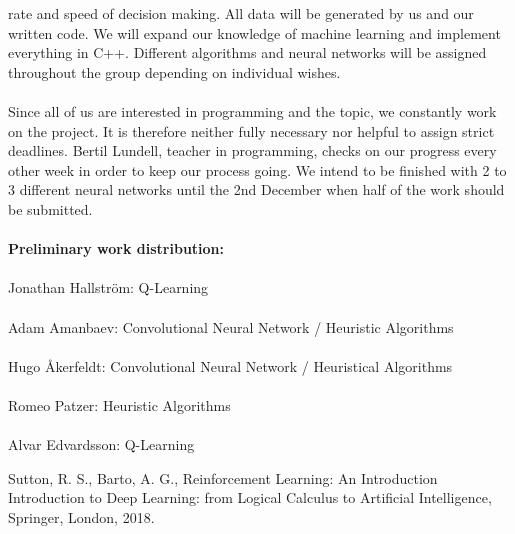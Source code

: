 \documentclass[titlepage]{article}
\begin{document}
rate and speed of decision making. All data will be generated by us and our written code. 
\newpage
\noindent
We will expand our knowledge of machine learning and implement everything in C++. Different algorithms and neural networks will be assigned throughout the group depending on individual wishes. \\\\Since all of us are interested in programming and the topic, we constantly work on the project. It is therefore neither fully necessary nor helpful to assign strict deadlines. Bertil Lundell, teacher in programming, checks on our progress every other week in order to keep our process going. We intend to be finished with 2 to 3 different neural networks until the 2nd December when half of the work should be submitted. \\\\\textbf{Preliminary work distribution:} \\\\Jonathan Hallström: Q-Learning \\\\Adam Amanbaev: Convolutional Neural Network / Heuristic Algorithms \\\\Hugo Åkerfeldt: Convolutional Neural Network / Heuristical Algorithms \\\\Romeo Patzer: Heuristic Algorithms \\\\Alvar Edvardsson: Q-Learning 

\begin{thebibliography}{100}
Sutton, R. S., Barto, A. G., Reinforcement Learning: An Introduction
Introduction to Deep Learning: from Logical Calculus to Artificial Intelligence, Springer,
London, 2018.
\end{thebibliography}
\end{document}
